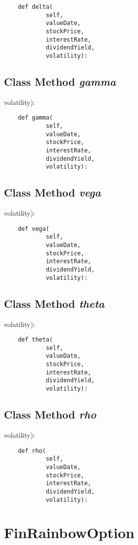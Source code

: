 \documentclass[twoside,11pt]{book}
\begin{document}
\begin{lstlisting}
    def delta(
            self,
            valueDate,
            stockPrice,
            interestRate,
            dividendYield,
            volatility):
\end{lstlisting}

\subsection{Class Method {\it gamma}}
volatility):

\begin{lstlisting}
    def gamma(
            self,
            valueDate,
            stockPrice,
            interestRate,
            dividendYield,
            volatility):
\end{lstlisting}

\subsection{Class Method {\it vega}}
volatility):

\begin{lstlisting}
    def vega(
            self,
            valueDate,
            stockPrice,
            interestRate,
            dividendYield,
            volatility):
\end{lstlisting}

\subsection{Class Method {\it theta}}
volatility):

\begin{lstlisting}
    def theta(
            self,
            valueDate,
            stockPrice,
            interestRate,
            dividendYield,
            volatility):
\end{lstlisting}

\subsection{Class Method {\it rho}}
volatility):

\begin{lstlisting}
    def rho(
            self,
            valueDate,
            stockPrice,
            interestRate,
            dividendYield,
            volatility):
\end{lstlisting}

\newpage
\section{FinRainbowOption}
\end{document}
